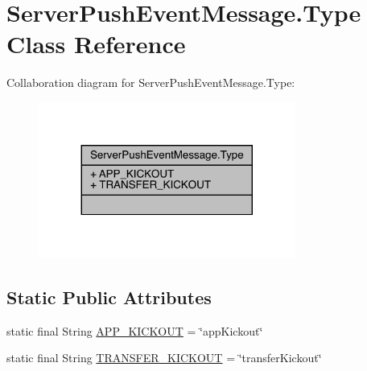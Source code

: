 \hypertarget{classcom_1_1toast_1_1android_1_1gamebase_1_1serverpush_1_1_server_push_event_message_1_1_type}{}\section{Server\+Push\+Event\+Message.\+Type Class Reference}
\label{classcom_1_1toast_1_1android_1_1gamebase_1_1serverpush_1_1_server_push_event_message_1_1_type}


Collaboration diagram for Server\+Push\+Event\+Message.\+Type\+:
\nopagebreak
\begin{figure}[H]
\begin{center}
\leavevmode
\includegraphics[width=239pt]{classcom_1_1toast_1_1android_1_1gamebase_1_1serverpush_1_1_server_push_event_message_1_1_type__coll__graph}
\end{center}
\end{figure}
\subsection*{Static Public Attributes}
\begin{DoxyCompactItemize}
\item 
static final String \hyperlink{classcom_1_1toast_1_1android_1_1gamebase_1_1serverpush_1_1_server_push_event_message_1_1_type_aed5d555ac6644d18d5b1525ecf9e0032}{A\+P\+P\+\_\+\+K\+I\+C\+K\+O\+UT} = \char`\"{}app\+Kickout\char`\"{}
\item 
static final String \hyperlink{classcom_1_1toast_1_1android_1_1gamebase_1_1serverpush_1_1_server_push_event_message_1_1_type_a81c56ad395197d1634b83ca193669bd8}{T\+R\+A\+N\+S\+F\+E\+R\+\_\+\+K\+I\+C\+K\+O\+UT} = \char`\"{}transfer\+Kickout\char`\"{}
\end{DoxyCompactItemize}


